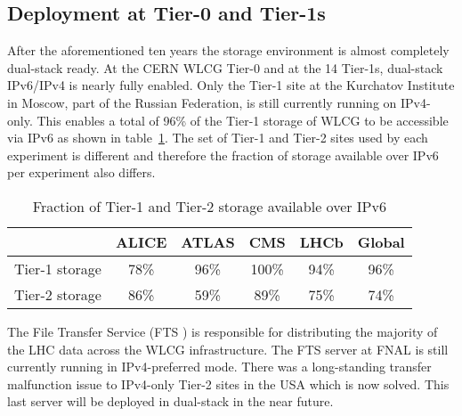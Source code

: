 
%
\subsection{Deployment at Tier-0 and Tier-1s}
After the aforementioned ten years the storage environment is almost completely dual-stack ready. At the CERN WLCG Tier-0 and at the 14 Tier-1s, dual-stack IPv6/IPv4 is nearly fully enabled. Only the Tier-1 site at the Kurchatov Institute in Moscow, part of the Russian Federation, is still currently running on IPv4-only. This enables a total of 96\% of the Tier-1 storage of WLCG to be accessible via IPv6 as shown in table~\ref{tab:t012stor}.  The set of Tier-1 and Tier-2 sites used by each experiment is different and therefore the fraction of storage available over IPv6 per experiment also differs.
\begin{table}[h]
\centering
\caption{Fraction of Tier-1 and Tier-2 storage available over IPv6}
\label{tab:t012stor}
\begin{tabular}{lccccc}
\hline
& ALICE & ATLAS & CMS & LHCb & Global \\\hline
Tier-1 storage & 78\% & 96\% & 100\% & 94\% & 96\% \\
Tier-2 storage & 86\% & 59\% &  89\% & 75\% & 74\% \\\hline
\end{tabular}
\end{table}

The File Transfer Service (FTS \cite{fts3}) is responsible for distributing the majority of the LHC data across the WLCG infrastructure.
The FTS server at FNAL is still currently running in IPv4-preferred mode. There was a long-standing transfer malfunction issue to IPv4-only Tier-2 sites in the USA which is now solved. This last server will be deployed in dual-stack in the near future.
